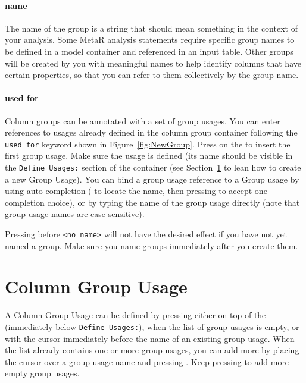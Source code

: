\paragraph{name} The name of the group is a string that should mean something in the context of your analysis. Some MetaR analysis statements require specific group names to be defined in a model container and referenced in an input table. Other groups will be created by you with meaningful names to help identify columns that have certain properties, so that you can refer to them collectively by the group name. 

\paragraph{used for}
Column groups can be annotated with a set of group usages. You can enter references to usages already defined in the column group container following the \texttt{used for} keyword shown in Figure~\ref{fig:NewGroup}. Press \keys{\enter} on the \mpsplaceholder{} to insert the first group usage. Make sure the usage is defined (its name should be visible in the \texttt{Define Usages:} section of the container (see Section~\ref{sec:ColumnGroupUsage} to lean how to create a new Group Usage). You can bind a group usage reference to a Group usage by using auto-completion (\keys{\ctrl+\space} to locate the name, then pressing \keys{\enter} to accept one completion choice), or by typing the name of the group usage directly (note that group usage names are case sensitive).

\begin{remark}
	Pressing \keys{\return} before \texttt{<no name>} will not have the desired effect if you have not yet named a group. Make sure you name groups immediately after you create them. 
\end{remark}

 
\section{Column Group Usage}\label{sec:ColumnGroupUsage}
A Column Group Usage can be defined by pressing \keys{\return} either on top of the \mpsplaceholder{} (immediately below \texttt{Define Usages:}), when the list of group usages is empty, or with the cursor immediately before the name of an existing group usage. When the list already contains one or more group usages, you can add more by placing the cursor over a group usage name and pressing \keys{\enter}. Keep pressing \keys{\enter} to add more empty group usages.

